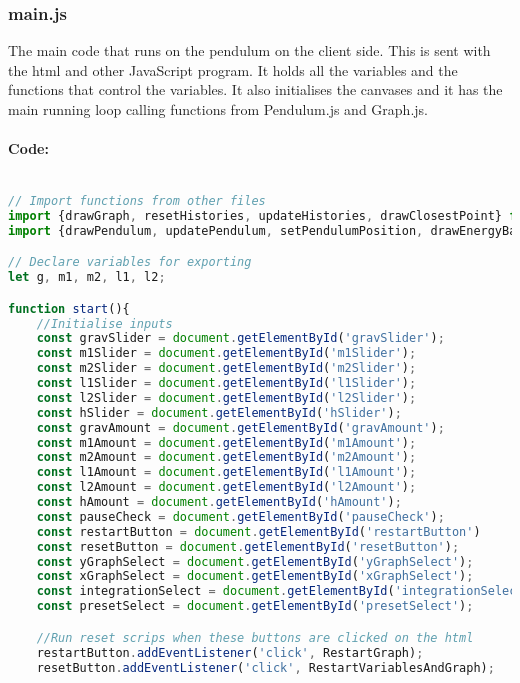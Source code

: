 \documentclass[12pt]{article}
\begin{document}
\subsubsection{main.js}
The main code that runs on the pendulum on the client side. This is sent with the html and other JavaScript program. It holds all the variables and the functions that control the variables. It also initialises the canvases and it has the main running loop calling functions from Pendulum.js and Graph.js.
\paragraph{Code:}
\begin{lstlisting}[language=JavaScript]

// Import functions from other files
import {drawGraph, resetHistories, updateHistories, drawClosestPoint} from "./graph.js";
import {drawPendulum, updatePendulum, setPendulumPosition, drawEnergyBar, updatePosHistories, getMaxEnergy, resetPendHistories} from "./pendulum.js";

// Declare variables for exporting
let g, m1, m2, l1, l2;

function start(){
    //Initialise inputs
    const gravSlider = document.getElementById('gravSlider');
    const m1Slider = document.getElementById('m1Slider');
    const m2Slider = document.getElementById('m2Slider');
    const l1Slider = document.getElementById('l1Slider');
    const l2Slider = document.getElementById('l2Slider');
    const hSlider = document.getElementById('hSlider');
    const gravAmount = document.getElementById('gravAmount');
    const m1Amount = document.getElementById('m1Amount');
    const m2Amount = document.getElementById('m2Amount');
    const l1Amount = document.getElementById('l1Amount');
    const l2Amount = document.getElementById('l2Amount');
    const hAmount = document.getElementById('hAmount');
    const pauseCheck = document.getElementById('pauseCheck');
    const restartButton = document.getElementById('restartButton')
    const resetButton = document.getElementById('resetButton');
    const yGraphSelect = document.getElementById('yGraphSelect');
    const xGraphSelect = document.getElementById('xGraphSelect');
    const integrationSelect = document.getElementById('integrationSelect');
    const presetSelect = document.getElementById('presetSelect');

    //Run reset scrips when these buttons are clicked on the html
    restartButton.addEventListener('click', RestartGraph);
    resetButton.addEventListener('click', RestartVariablesAndGraph);


\end{lstlisting}
\end{document}
